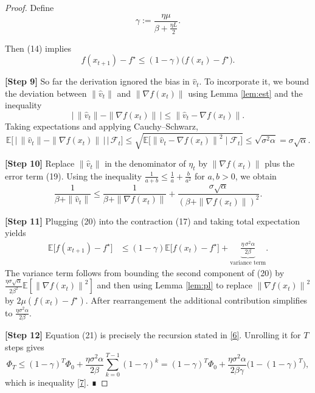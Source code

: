 \documentclass{article}
\newcommand{\E}{\mathbb{E}}
\newcommand{\norm}[1]{\left\|#1\right\|}
\begin{document}
\begin{proof}
Define
\[
    \gamma := \frac{\eta\mu}{\beta+\frac{\eta L}{2}} .
\tag{16}
\]

Then (14) implies
\[
    f(x_{t+1})-f^\star \le (1-\gamma)\bigl(f(x_t)-f^\star\bigr) .
\tag{17}
\]

\textbf{[Step 9]} So far the derivation ignored the bias in $\hat v_t$. To incorporate it, we bound the deviation between $\|\hat v_t\|$ and $\|\nabla f(x_t)\|$ using Lemma \ref{lem:est} and the inequality
\[
    \bigl|\,\|\hat v_t\| - \|\nabla f(x_t)\|\,\bigr|
    \le \norm{\hat v_t - \nabla f(x_t)} .
\tag{18}
\]
Taking expectations and applying Cauchy–Schwarz,
\[
    \E\!\bigl[\,\bigl|\,\|\hat v_t\| - \|\nabla f(x_t)\|\,\bigr|\,\big|\,\mathcal{F}_t\bigr]
    \le \sqrt{\E\!\bigl[\norm{\hat v_t-\nabla f(x_t)}^2\mid\mathcal{F}_t\bigr]}
    \le \sqrt{\sigma^2\alpha}= \sigma\sqrt{\alpha}.
\tag{19}
\]

\textbf{[Step 10]} Replace $\|\hat v_t\|$ in the denominator of $\eta_t$ by $\|\nabla f(x_t)\|$ plus the error term (19). Using the inequality $\frac{1}{a+b}\le\frac{1}{a}+ \frac{b}{a^2}$ for $a,b>0$, we obtain
\[
    \frac{1}{\beta+\|\hat v_t\|}
    \le \frac{1}{\beta+\|\nabla f(x_t)\|}
       + \frac{\sigma\sqrt{\alpha}}{(\beta+\|\nabla f(x_t)\|)^2}.
\tag{20}
\]

\textbf{[Step 11]} Plugging (20) into the contraction (17) and taking total expectation yields
\[
\begin{aligned}
    \E\!\bigl[f(x_{t+1})-f^\star\bigr]
    &\le (1-\gamma)\E\!\bigl[f(x_t)-f^\star\bigr]
       + \underbrace{\frac{\eta\,\sigma^2\alpha}{2\beta}}_{\text{variance term}} .
\end{aligned}
\tag{21}
\]
The variance term follows from bounding the second component of (20) by $\frac{\eta\sigma\sqrt{\alpha}}{2\beta^2}\E[\norm{\nabla f(x_t)}^2]$ and then using Lemma \ref{lem:pl} to replace $\norm{\nabla f(x_t)}^2$ by $2\mu(f(x_t)-f^\star)$. After rearrangement the additional contribution simplifies to $\frac{\eta\sigma^2\alpha}{2\beta}$.

\textbf{[Step 12]} Equation (21) is precisely the recursion stated in \eqref{6}. Unrolling it for $T$ steps gives
\[
    \Phi_T \le (1-\gamma)^T\Phi_0 + \frac{\eta\sigma^2\alpha}{2\beta}\sum_{k=0}^{T-1}(1-\gamma)^k
    = (1-\gamma)^T\Phi_0 + \frac{\eta\sigma^2\alpha}{2\beta\gamma}\bigl(1-(1-\gamma)^T\bigr),
\]
which is inequality \eqref{7}. ∎
\end{proof}
\end{document}
